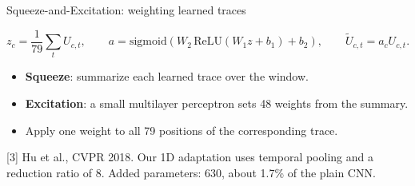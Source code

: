 \documentclass[aspectratio=169,11pt]{beamer}
\newcommand{\source}[1]{\vfill\par{\fontsize{7}{8}\selectfont\color{Muted}#1}}
\begin{document}
\begin{frame}{Squeeze-and-Excitation: weighting learned traces}
\begin{center}\end{center}
\[z_c=\frac1{79}\sum_t U_{c,t},\qquad
 a=\mathrm{sigmoid}\!\left(W_2\,\mathrm{ReLU}(W_1z+b_1)+b_2\right),\qquad
 \widetilde U_{c,t}=a_cU_{c,t}.\]
\begin{itemize}\setlength\itemsep{2mm}
\item \textbf{Squeeze}: summarize each learned trace over the window.
\item \textbf{Excitation}: a small multilayer perceptron sets 48 weights from the summary.
\item Apply one weight to all 79 positions of the corresponding trace.
\end{itemize}
\source{[3] Hu et al., CVPR 2018. Our 1D adaptation uses temporal pooling and a reduction ratio of 8. Added parameters: 630, about 1.7\% of the plain CNN.}
\end{frame}
\end{document}
